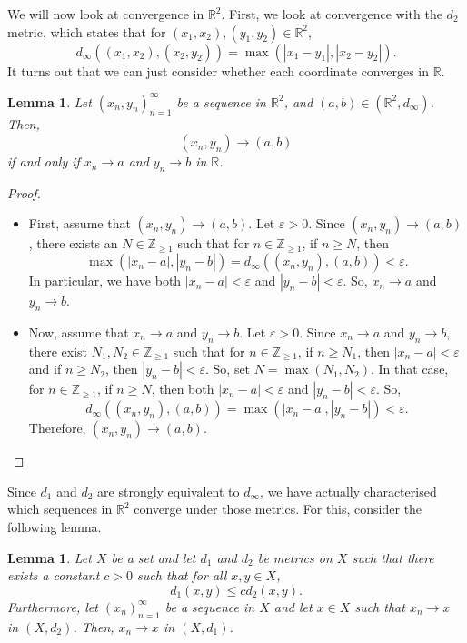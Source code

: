 \documentclass[a4paper, openany]{memoir}
\theoremstyle{definition}
\theoremstyle{plain}
\newtheorem{lemma}[definition]{Lemma}
\begin{document}
We will now look at convergence in $\mathbb{R}^2$. First, we look at convergence with the $d_2$ metric, which states that for $(x_1, x_2), (y_1, y_2) \in \mathbb{R}^2$,
\[d_\infty((x_1, x_2), (x_2, y_2)) = \max(|x_1 - y_1|, |x_2 - y_2|).\]
It turns out that we can just consider whether each coordinate converges in $\mathbb{R}$.
\begin{lemma}
Let $(x_n, y_n)_{n=1}^{\infty}$ be a sequence in $\mathbb{R}^2$, and $(a, b) \in (\mathbb{R}^2, d_\infty)$. Then,
\[(x_n, y_n) \to (a, b)\]
if and only if $x_n \to a$ and $y_n \to b$ in $\mathbb{R}$.
\end{lemma}
\begin{proof}
\hspace*{0pt}
\begin{itemize}
    \item First, assume that $(x_n, y_n) \to (a, b)$. Let $\varepsilon > 0$. Since $(x_n, y_n) \to (a, b)$, there exists an $N \in \mathbb{Z}_{\geqslant 1}$ such that for $n \in \mathbb{Z}_{\geqslant 1}$, if $n \geqslant N$, then 
    \[\max(|x_n - a|, |y_n - b|) = d_{\infty}((x_n, y_n), (a, b)) < \varepsilon.\]
    In particular, we have both $|x_n - a| < \varepsilon$ and $|y_n - b| < \varepsilon$. So, $x_n \to a$ and $y_n \to b$.
    
    \item Now, assume that $x_n \to a$ and $y_n \to b$. Let $\varepsilon > 0$. Since $x_n \to a$ and $y_n \to b$, there exist $N_1, N_2 \in \mathbb{Z}_{\geqslant 1}$ such that for $n \in \mathbb{Z}_{\geqslant 1}$, if $n \geqslant N_1$, then $|x_n - a| < \varepsilon$ and if $n \geqslant N_2$, then $|y_n - b| < \varepsilon$. So, set $N = \max(N_1, N_2)$. In that case, for $n \in \mathbb{Z}_{\geqslant 1}$, if $n \geqslant N$, then both $|x_n - a| < \varepsilon$ and $|y_n - b| < \varepsilon$. So,
    \[d_{\infty}((x_n, y_n), (a, b)) = \max(|x_n - a|, |y_n - b|) < \varepsilon.\]
    Therefore, $(x_n, y_n) \to (a, b)$.
\end{itemize}
\end{proof}
Since $d_1$ and $d_2$ are strongly equivalent to $d_\infty$, we have actually characterised which sequences in $\mathbb{R}^2$ converge under those metrics. For this, consider the following lemma.
\begin{lemma}
Let $X$ be a set and let $d_1$ and $d_2$ be metrics on $X$ such that there exists a constant $c > 0$ such that for all $x, y \in X$,
\[d_1(x, y) \leqslant cd_2(x, y).\]
Furthermore, let $(x_n)_{n=1}^{\infty}$ be a sequence in $X$ and let $x \in X$ such that $x_n \to x$ in $(X, d_2)$. Then, $x_n \to x$ in $(X, d_1)$.
\end{lemma}
\end{document}
